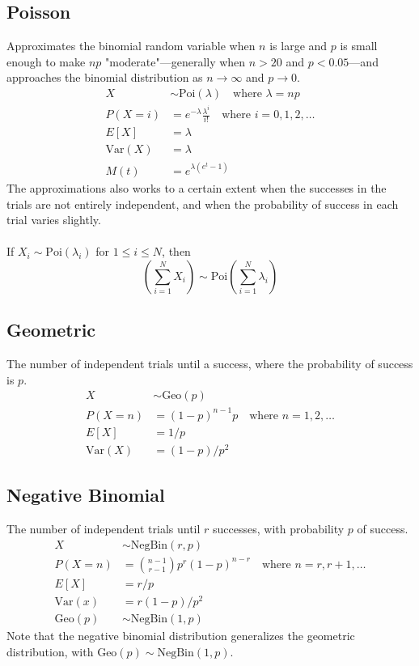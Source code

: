 \documentclass[12pt]{article}
\newcommand{\Sp}{\text{ }}
\newcommand{\Var}{\text{Var}}
\newcommand{\Poi}{\text{Poi}}
\newcommand{\Geo}{\text{Geo}}
\newcommand{\Where}{\Sp\text{ where }}
\begin{document}
\subsection{Poisson}
Approximates the binomial random variable when $n$ is large and $p$ is small enough to make $np$ "moderate"---generally when $n > 20$ and $p < 0.05$---and approaches the binomial distribution as $n \rightarrow \infty$ and $p \rightarrow 0$.
\begin{align*}
    X& \sim \Poi(\lambda) \Where \lambda = np \\
    P(X = i)& = e^{-\lambda} \frac{\lambda^i}{i!} \Where i = 0,1,2,\ldots\\
        E[X]& = \lambda \\
     \Var(X)& = \lambda \\
        M(t)& = e^{\lambda (e^t - 1)}
\end{align*}
The approximations also works to a certain extent when the successes in the trials are not entirely independent, and when the probability of success in each trial varies slightly. \\
\\
If $X_i \sim \Poi(\lambda_i)$ for $1 \leq i \leq N$, then
\[
    \left( \sum_{i=1}^N X_i \right) \sim \Poi\left(\sum_{i=1}^N \lambda_i \right)
\]

\subsection{Geometric}
The number of independent trials until a success, where the probability of success is $p$.
\begin{align*}
    X& \sim \Geo(p) \\
    P(X = n)& = (1-p)^{n-1} p \Where n = 1, 2, \ldots\\
        E[X]& = 1/p \\
     \Var(X)& = (1-p)/p^2
\end{align*}

\subsection{Negative Binomial}
The number of independent trials until $r$ successes, with probability $p$ of success.
\begin{align*}
    X& \sim \text{NegBin}(r, p) \\
    P(X = n)& = \binom{n-1}{r-1} p^r (1-p)^{n-r} \Where n = r, r+1, \ldots \\
        E[X]& = r / p \\
     \Var(x)& = r(1-p)/p^2 \\
     \Geo(p)& \sim \text{NegBin}(1, p)
\end{align*}
Note that the negative binomial distribution generalizes the geometric distribution, with $\Geo(p) \sim \text{NegBin}(1, p)$.
\end{document}
